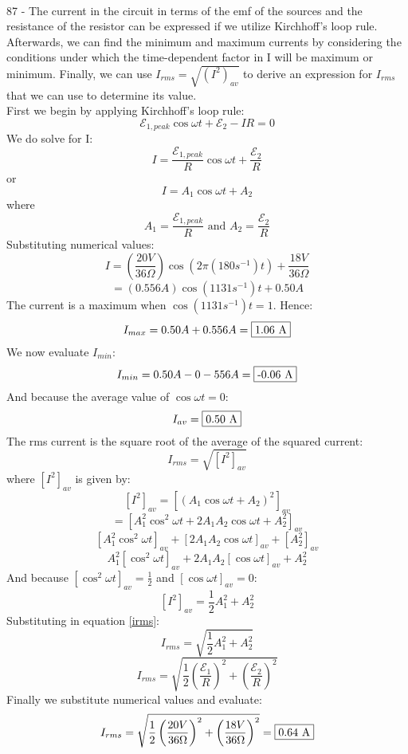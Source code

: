 \documentclass{report}
\begin{document}
\paragraph{}
87 - The current in the circuit in terms of the emf of the sources and the resistance of the resistor can be expressed if we utilize Kirchhoff's loop rule. Afterwards, we can find the minimum and maximum currents by considering the conditions under which the time-dependent factor in I will be maximum or minimum. Finally, we can use $I_{rms} = \sqrt{(I^2)_{av}}$ to derive an expression for $I_{rms}$ that we can use to determine its value.\\
First we begin by applying Kirchhoff's loop rule:
$$\mathcal{E}_{1,peak} \cos \omega t + \mathcal{E}_2 - IR = 0$$
We do solve for I:
$$I = \frac{\mathcal{E}_{1,peak}}{R} \cos \omega t + \frac{\mathcal{E}_2}{R}$$
or
$$I = A_1 \cos \omega t + A_2$$
where
$$A_1 = \frac{\mathcal{E}_{1,peak}}{R} \text{ and } A_2 = \frac{\mathcal{E}_2}{R}$$
Substituting numerical values:
$$I = \left( \frac{20 V}{36 \Omega} \right) \cos (2 \pi (180s^{-1})t) + \frac{18 V}{36 \Omega}$$
$$= (0.556 A) \cos (1131s^{-1})t + 0.50 A$$
The current is a maximum when $\cos (1131s^{-1})t = 1$. Hence:
$$I_{max} = 0.50 A + 0.556 A = \fbox{1.06 A}$$
We now evaluate $I_{min}$:
$$I_{min} = 0.50 A - 0-556 A = \fbox{-0.06 A}$$
And because the average value of $\cos \omega t = 0$:
$$I_{av} = \fbox{0.50 A}$$
The rms current is the square root of the average of the squared current:
\begin{equation}\label{irms}
  I_{rms} = \sqrt{[I^2]_{av}}
\end{equation}
where $[I^2]_{av}$ is given by:
$$[I^2]_{av} = [(A_1 \cos \omega t + A_2)^2]_{av}$$
$$= [A_1^2 \cos^2 \omega t + 2 A_1 A_2 \cos \omega t + A_2^2]_{av}$$
$$[A_1^2 \cos^2 \omega t]_{av} +[2A_1A_2 \cos \omega t]_{av} + [A_2^2]_{av}$$
$$A_1^2[\cos^2 \omega t]_{av} +2A_1A_2[\cos \omega t]_{av} + A_2^2$$
And because $[\cos^2 \omega t]_{av} = \frac{1}{2}$ and $[\cos \omega t]_{av} = 0$:
$$[I^2]_{av} = \frac{1}{2}A_1^2 + A_2^2$$
Substituting in equation \ref{irms}:
$$I_{rms} = \sqrt{\frac{1}{2}A_1^2 + A_2^2}$$
$$I_{rms} = \sqrt{\frac{1}{2} \left( \frac{\mathcal{E}_1}{R} \right)^2 + \left( \frac{\mathcal{E}_2}{R} \right)^2}$$
Finally we substitute numerical values and evaluate:
$$I_{rms} = \sqrt{\frac{1}{2}\left( \frac{20 V}{36 \Omega} \right)^2 + \left( \frac{18 V}{36 \Omega} \right)^2} = \fbox{0.64 A}$$
\end{document}
